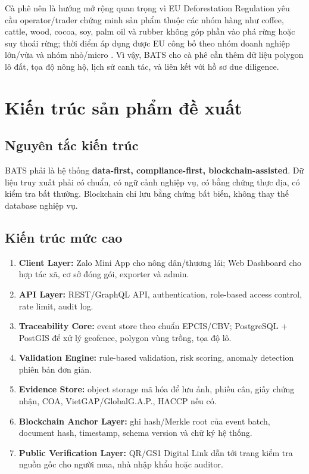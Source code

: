 \documentclass[12pt,a4paper]{article}
\begin{document}
Cà phê nên là hướng mở rộng quan trọng vì EU Deforestation Regulation yêu cầu operator/trader chứng minh sản phẩm thuộc các nhóm hàng như coffee, cattle, wood, cocoa, soy, palm oil và rubber không góp phần vào phá rừng hoặc suy thoái rừng; thời điểm áp dụng được EU công bố theo nhóm doanh nghiệp lớn/vừa và nhóm nhỏ/micro \cite{eu_eudr}. Vì vậy, BATS cho cà phê cần thêm dữ liệu polygon lô đất, tọa độ nông hộ, lịch sử canh tác, và liên kết với hồ sơ due diligence.

\section{Kiến trúc sản phẩm đề xuất}

\subsection{Nguyên tắc kiến trúc}

\begin{tcolorbox}[colback=blue!3!white,colframe=blue!40!black,title=Nguyên tắc thiết kế]
BATS phải là hệ thống \textbf{data-first, compliance-first, blockchain-assisted}. Dữ liệu truy xuất phải có chuẩn, có ngữ cảnh nghiệp vụ, có bằng chứng thực địa, có kiểm tra bất thường. Blockchain chỉ lưu bằng chứng bất biến, không thay thế database nghiệp vụ.
\end{tcolorbox}

\subsection{Kiến trúc mức cao}

\begin{enumerate}[leftmargin=2em]
    \item \textbf{Client Layer:} Zalo Mini App cho nông dân/thương lái; Web Dashboard cho hợp tác xã, cơ sở đóng gói, exporter và admin.
    \item \textbf{API Layer:} REST/GraphQL API, authentication, role-based access control, rate limit, audit log.
    \item \textbf{Traceability Core:} event store theo chuẩn EPCIS/CBV; PostgreSQL + PostGIS để xử lý geofence, polygon vùng trồng, tọa độ lô.
    \item \textbf{Validation Engine:} rule-based validation, risk scoring, anomaly detection phiên bản đơn giản.
    \item \textbf{Evidence Store:} object storage mã hóa để lưu ảnh, phiếu cân, giấy chứng nhận, COA, VietGAP/GlobalG.A.P., HACCP nếu có.
    \item \textbf{Blockchain Anchor Layer:} ghi hash/Merkle root của event batch, document hash, timestamp, schema version và chữ ký hệ thống.
    \item \textbf{Public Verification Layer:} QR/GS1 Digital Link dẫn tới trang kiểm tra nguồn gốc cho người mua, nhà nhập khẩu hoặc auditor.
\end{enumerate}
\end{document}
